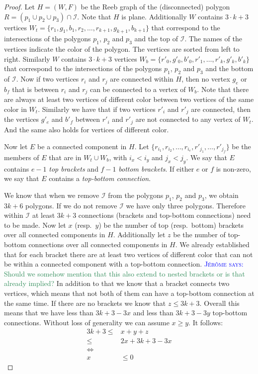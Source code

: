 \documentclass{paper}
\newcommand{\mremark}[3]{\textcolor{blue}{\textsc{#1 #2:}} \textcolor{SeaGreen}{\textsf{#3}}}
\newcommand{\jerome}[2][says]{\mremark{J\'er\^ome}{#1}{#2}}
\newcommand{\ixi}{\mathcal{I}}
\begin{document}
{\begin{proof}
Let $H=(W, F)$ be the Reeb graph of the (disconnected) polygon $R=(p_1\cup p_2\cup p_3)\cap \ixi$.
Note that $H$ is plane. Additionally $W$ contains $3\cdot k + 3$ vertices $W_t=\{r_1, g_1, b_1, r_2,\dots, r_{k+1}, g_{k+1}, b_{k+1}\}$ that correspond to the intersections of the polygons $p_1$, $p_2$ and $p_3$ and the top of $\ixi$. The names of the vertices indicate the color of the polygon. The vertices are sorted from left to right.
Similarly $W$ contains $3\cdot k + 3$ vertices $W_b=\textbf{}\{r'_0, g'_0, b'_0, r'_1,\dots, r'_k, g'_k, b'_k\}$ that correspond to the intersections of the polygons $p_1$, $p_2$ and $p_3$ and the bottom of $\ixi$.
Now if two vertices $r_i$ and $r_j$ are connected within $H$, then no vertex $g_e$ or $b_f$ that is between $r_i$ and $r_j$ can be connected to a vertex of $W_b$. Note that there are always at least two vertices of different color between two vertices of the same color in $W_t$.
Similarly we have that if two vertices $r'_i$ and $r'_j$ are connected, then the vertices $g'_e$ and $b'_f$ between $r'_i$ and $r'_j$ are not connected to any vertex of $W_t$.
And the same also holds for vertices of different color.

Now let $E$ be a connected component in $H$. Let $\{r_{i_1}, r_{i_2}, \dots, r_{i_e}, r'_{j_1}, \dots, r'_{j_f}\}$ be the members of $E$ that are in $W_t\cup W_b$, with $i_x<i_y$ and $j_x<j_y$. We say that $E$ contains $e-1$ \emph{top brackets} and $f-1$ \emph{bottom brackets}. If either $e$ or $f$ is non-zero, we say that $E$ contains a \emph{top-bottom connection}.

We know that when we remove $\ixi$ from the polygons $p_1$, $p_2$ and $p_3$, we obtain $3k+6$ polygons. If we do not remove $\ixi$ we have only three polygons. Therefore within $\ixi$ at least $3k+3$ connections (brackets and top-bottom connections) need to be made.
Now let $x$ (resp.\ $y$) be the number of top (resp.\ bottom) brackets over all connected components in $H$. Additionally let $z$ be the number of top-bottom connections over all connected components in $H$.
We already established that for each bracket there are at least two vertices of different color that can not be within a connected component with a top-bottom connection.
\jerome{Should we somehow mention that this also extend to nested brackets or is that already implied?}
In addition to that we know that a bracket connects two vertices, which means that not both of them can have a top-bottom connection at the same time.
If there are no brackets we know that $z\leq 3 k +3$.
Overall this means that we have less than $3k+3 - 3x$ and less than $3k+3 - 3y$ top-bottom connections.
Without loss of generality we can assume $x\geq y$.
It follows:
\begin{align*}
    3k+3\leq& x+y+z\\
    \leq& 2x + 3k+3 - 3x \\
    \iff& \\
    x&\leq 0 
\end{align*}


\end{proof}}
\end{document}
